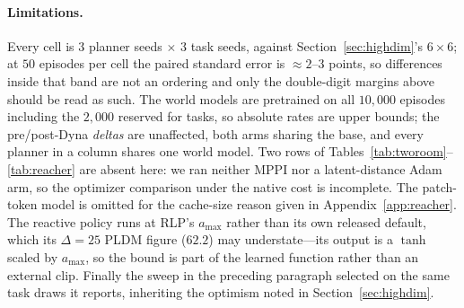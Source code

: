 \paragraph{Limitations.}
Every cell is $3$ planner seeds $\times$ $3$ task seeds, against
Section~\ref{sec:highdim}'s $6\times6$; at $50$ episodes per cell the paired
standard error is ${\approx}2$--$3$ points, so differences inside that band are
not an ordering and only the double-digit margins above should be read as
such.  The world models are pretrained
on all $10{,}000$ episodes including the $2{,}000$ reserved for tasks, so
absolute rates are upper bounds; the pre/post-Dyna \emph{deltas} are unaffected,
both arms sharing the base, and every planner in a column shares one world
model. Two rows of Tables~\ref{tab:tworoom}--\ref{tab:reacher} are absent here:
we ran neither MPPI nor a latent-distance Adam arm, so the optimizer comparison
under the native cost is incomplete. The patch-token model is omitted for the
cache-size reason given in Appendix~\ref{app:reacher}. The reactive policy runs
at RLP's $a_{\max}$ rather than its own released default, which its $\Delta=25$
PLDM figure ($62.2$) may understate---its output is a $\tanh$ scaled by
$a_{\max}$, so the bound is part of the learned function rather than an external
clip. Finally the sweep in the preceding paragraph selected on the same task
draws it reports, inheriting the optimism noted in
Section~\ref{sec:highdim}. 
